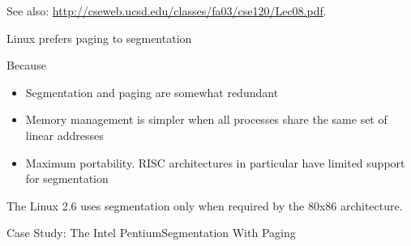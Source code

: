 See also: \url{http://cseweb.ucsd.edu/classes/fa03/cse120/Lec08.pdf}.

\begin{frame}{Linux prefers paging to segmentation}
  \begin{iblock}{Because}
  \begin{itemize}
  \item Segmentation and paging are somewhat redundant
  \item Memory management is simpler when all processes share the same set of linear addresses
  \item Maximum portability. RISC architectures in particular have limited support for segmentation
  \end{itemize}
  \end{iblock}
  The Linux 2.6 uses segmentation only when required by the 80x86 architecture.
\end{frame}



\begin{frame}{Case Study: The Intel Pentium}{Segmentation With Paging}
  \begin{center}
  \end{center}
  \vspace{1em}
  \begin{minipage}{.3\linewidth}
    \begin{center}
    \end{center}
  \end{minipage}\hfill
  \begin{minipage}{.6\linewidth}
    \begin{center}
    \end{center}
  \end{minipage}
\end{frame}


